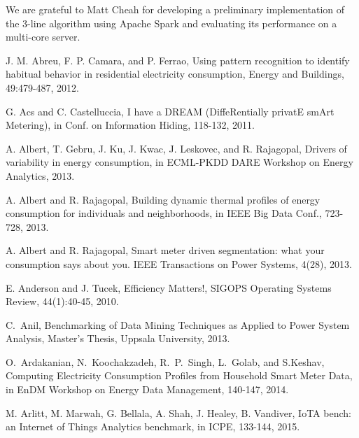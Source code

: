 \documentclass[prodmode,acmtods]{acmsmall}
\begin{document}
\begin{acks}
We are grateful to Matt Cheah for developing a preliminary implementation of the 3-line algorithm using Apache Spark and evaluating its performance on a multi-core server.
\end{acks}


\begin{thebibliography}{12}

\small

J. M. Abreu, F. P. Camara, and P. Ferrao, Using pattern recognition to identify habitual behavior in residential electricity consumption, Energy and Buildings, 49:479-487, 2012.

G. Acs and C. Castelluccia, I have a DREAM (DiffeRentially privatE smArt Metering), in Conf. on Information Hiding, 118-132, 2011.

A. Albert, T. Gebru, J. Ku, J. Kwac, J. Leskovec, and R. Rajagopal, Drivers of variability in energy consumption, in ECML-PKDD DARE Workshop on Energy Analytics, 2013.

A. Albert and R. Rajagopal, Building dynamic thermal profiles of energy consumption for individuals and neighborhoods, in IEEE Big Data Conf., 723-728, 2013.

A. Albert and R. Rajagopal, Smart meter driven segmentation: what your consumption says about you. IEEE Transactions on Power Systems, 4(28), 2013.

E. Anderson and J. Tucek, Efficiency Matters!, SIGOPS Operating Systems Review, 44(1):40-45, 2010.

C.~Anil, Benchmarking of Data Mining Techniques as Applied to Power System Analysis, Master's Thesis, Uppsala University, 2013.

O.~Ardakanian, N.~Koochakzadeh, R.~P.~Singh, L.~Golab, and S.Keshav, Computing Electricity Consumption Profiles from Household Smart Meter Data, in EnDM Workshop on Energy Data Management, 140-147, 2014.

M. Arlitt, M. Marwah, G. Bellala, A. Shah, J. Healey, B. Vandiver, IoTA bench: an Internet of Things Analytics benchmark, in ICPE, 133-144, 2015.


\end{thebibliography}
\end{document}
